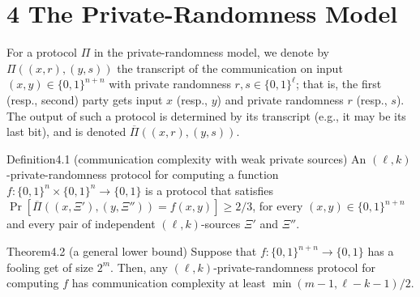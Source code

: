 \section*{4 The Private-Randomness Model}
For a protocol $\Pi$ in the private-randomness model, we denote by $\Pi((x,r),(y,s))$ the transcript of the communication on input $(x,y)\in\{0,1\}^{n+n}$ with private randomness $r,s\in\{0,1\}^\ell$; that is, the first (resp., second) party gets input $x$ (resp., $y$) and private randomness $r$ (resp., $s$). The output of such a protocol is determined by its transcript (e.g., it may be its last bit), and is denoted $\overline\Pi((x,r),(y,s))$.
\begin{authorclaim}{Definition4.1 (communication complexity with weak private sources)}
An $(\ell,k)$-private-randomness protocol for computing a function $f:\{0,1\}^n\times\{0,1\}^n\to\{0,1\}$ is a protocol that satisfies $\Pr[\overline\Pi((x,\Xi'),(y,\Xi''))=f(x,y)]\ge2/3$, for every $(x,y)\in\{0,1\}^{n+n}$ and every pair of independent $(\ell,k)$-sources $\Xi'$ and $\Xi''$.
\end{authorclaim}
\begin{authorclaim}{Theorem4.2 (a general lower bound)}
Suppose that $f:\{0,1\}^{n+n}\to\{0,1\}$ has a fooling get of size $2^m$. Then, any $(\ell,k)$-private-randomness protocol for computing $f$ has communication complexity at least $\min(m-1,\ell-k-1)/2$.
\end{authorclaim}
